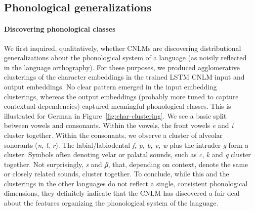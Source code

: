 
\subsection{Phonological generalizations}

\paragraph{Discovering phonological classes} We first inquired,
qualitatively, whether CNLMs are discovering distributional
generalizations about the phonological system of a language (as
noisily reflected in the language orthography). For these purposes, we
produced agglomerative clusterings of the character embeddings in the
trained LSTM CNLM input and output embeddings. No clear pattern
emerged in the input embedding clusterings, whereas the output
embeddings (probably more tuned to capture contextual dependencies)
captured meaningful phonological classes. This is illustrated for
German in Figure~\ref{fig:char-clustering}. We see a basic split
between vowels and consonants. Within the vowels, the front vowels
\emph{e} and \emph{i} cluster together. Within the consonants, we
observe a cluster of alveolar sonorants (\emph{n, l, r}). The
labial/labiodental \emph{f, p, b, v, w} plus the intruder \emph{g}
form a cluster. Symbols often denoting velar or palatal sounds, such
as \emph{c}, \emph{k} and \emph{q} cluster together. Not surprisingly,
\emph{s} and \emph{{\ss}}, that, depending on context, denote the same
or closely related sounds, cluster together. To conclude, while this
and the clusterings in the other languages do not reflect a single,
consistent phonological dimensions, they definitely indicate that the
CNLM has discovered a fair deal about the features organizing the
phonological system of the language.



